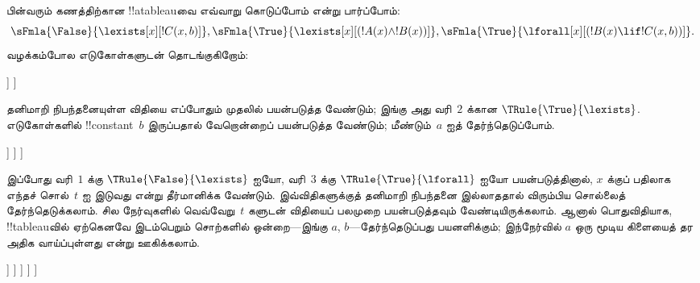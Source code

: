\documentclass[../../../include/open-logic-section]{subfiles}
\begin{document}
\begin{ex}
பின்வரும் கணத்திற்கான !!a{tableau}வை எவ்வாறு கொடுப்போம் என்று பார்ப்போம்:
\[
\sFmla{\False}{\lexists[x][!C(x,b)]},
\sFmla{\True}{\lexists[x][(!A(x) \land !B(x))]},
\sFmla{\True}{\lforall[x][(!B(x) \lif !C(x,b))]}.
\]
வழக்கம்போல எடுகோள்களுடன் தொடங்குகிறோம்:
\begin{oltableau}
  [\sFmla{\False}{\lexists[x][\formula{C}(x,b)]}, just=\TAss
    [\sFmla{\True}{\lexists[x][(\formula{A}(x) \land \formula{B}(x))]},
      just=\TAss
      [\sFmla{\True}{\lforall[x][(\formula{B}(x) \lif \formula{C}(x,b))]},
        just=\TAss]
    ]
  ]
\end{oltableau}

தனிமாறி நிபந்தனையுள்ள விதியை எப்போதும் முதலில் பயன்படுத்த வேண்டும்; இங்கு
அது வரி~$2$ க்கான $\TRule{\True}{\lexists}$. எடுகோள்களில்
!!{constant}~$b$ இருப்பதால் வேறொன்றைப் பயன்படுத்த வேண்டும்; மீண்டும்~$a$ ஐத்
தேர்ந்தெடுப்போம்.
\begin{oltableau}
  [\sFmla{\False}{\lexists[x][\formula{C}(x,b)]}, just=\TAss
    [\sFmla{\True}{\lexists[x][(\formula{A}(x) \land \formula{B}(x))]},
      just=\TAss, checked
      [\sFmla{\True}{\lforall[x][(\formula{B}(x) \lif \formula{C}(x,b))]},
        just=\TAss
        [\sFmla{\True}{\formula{A}(a) \land \formula{B}(a)},
          just={\TRule{\True}{\lexists}[2]}]
      ]
    ]
  ]
\end{oltableau}

இப்போது வரி~$1$ க்கு $\TRule{\False}{\lexists}$ ஐயோ, வரி~$3$ க்கு
$\TRule{\True}{\lforall}$ ஐயோ பயன்படுத்தினால், $x$ க்குப் பதிலாக எந்தச்
சொல்~$t$ ஐ இடுவது என்று தீர்மானிக்க வேண்டும். இவ்விதிகளுக்குத் தனிமாறி
நிபந்தனை இல்லாததால் விரும்பிய சொல்லைத் தேர்ந்தெடுக்கலாம். சில நேர்வுகளில்
வெவ்வேறு~$t$ களுடன் விதியைப் பலமுறை பயன்படுத்தவும் வேண்டியிருக்கலாம். ஆனால்
பொதுவிதியாக, !!{tableau}வில் ஏற்கெனவே இடம்பெறும் சொற்களில் ஒன்றை---இங்கு
$a$, $b$---தேர்ந்தெடுப்பது பயனளிக்கும்; இந்நேர்வில் $a$ ஒரு மூடிய கிளையைத்
தர அதிக வாய்ப்புள்ளது என்று ஊகிக்கலாம்.
\begin{oltableau}
  [\sFmla{\False}{\lexists[x][\formula{C}(x,b)]}, just=\TAss
    [\sFmla{\True}{\lexists[x][(\formula{A}(x) \land \formula{B}(x))]},
      just=\TAss, checked
      [\sFmla{\True}{\lforall[x][(\formula{B}(x) \lif \formula{C}(x,b))]}, just=\TAss
        [\sFmla{\True}{\formula{A}(a) \land \formula{B}(a)}, just={\TRule{\True}{\lexists}[2]}
          [\sFmla{\False}{\formula{C}(a,b)}, just={\TRule{\False}{\lexists}[1]}
            [\sFmla{\True}{\formula{B}(a) \lif \formula{C}(a,b)},
              just={\TRule{\True}{\lforall}[3]}
            ]
          ]
        ]
      ]
    ]
  ]
\end{oltableau}


\end{ex}
\end{document}
